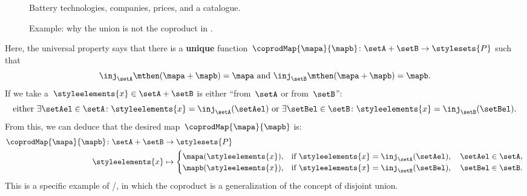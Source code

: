 \begin{example}
	\begin{figure*}[tbh]
		\centering
		\caption{Battery technologies, companies, prices, and a catalogue.}
		\label{fig:coprod_batteries_1}
	\end{figure*}

	\begin{figure*}[tbh]
		\centering
		\caption{Example: why the union is not the coproduct in \Set.}
		\label{fig:coprod_batteries_2}
	\end{figure*}

	Here, the universal property says that there is a \textbf{unique} function~$\coprodMap{\mapa}{\mapb}\colon \setA+\setB\to \stylesets{P}$ such that
	\begin{equation}
		\label{eq:exa-batt-factoring-maps}
		\inj_\setA\mthen (\mapa+ \mapb)=\mapa \text{ and }\inj_\setB\mthen (\mapa+ \mapb)=\mapb.
	\end{equation}
	If we take a~$\styleelements{x}\in \setA+\setB$ is either ``from~$\setA$ or from~$\setB$'':
	\begin{equation}
		\label{eq:exa-batt-explain-sum-map}
		\text{either } \exists \setAel\in \setA\colon \styleelements{x}=\inj_\setA(\setAel) \text{ or }\exists \setBel\in \setB\colon \styleelements{x}=\inj_\setB(\setBel).
	\end{equation}
	From this, we can deduce that the desired map~$\coprodMap{\mapa}{\mapb}$ is:
	\begin{equation}
		\label{eq:exa-batt-def-sum-map}
		\begin{aligned}
			\coprodMap{\mapa}{\mapb} \colon  \setA + \setB & \to \stylesets{P} \\
			\styleelements{x}                              & \mapsto
			\begin{cases}
				\mapa(\styleelements{x}), & \text{if } \styleelements{x}=\inj_\setA(\setAel),\quad \setAel \in \setA, \\
				\mapb(\styleelements{x}), & \text{if } \styleelements{x}=\inj_\setB(\setBel),\quad \setBel \in \setB.
			\end{cases}
		\end{aligned}
	\end{equation}
	This is a specific example of \Set/\FinSet, in which the coproduct is a generalization of the concept of disjoint union.

\end{example}
